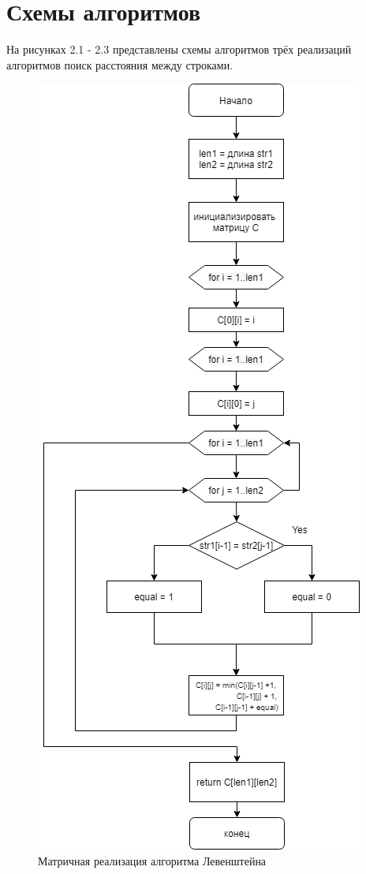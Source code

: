 \documentclass[12pt, a4paper]{report}
\begin{document}
	\section{Схемы алгоритмов}
	На рисунках 2.1 - 2.3 представлены схемы алгоритмов трёх реализаций алгоритмов поиск расстояния между строками.
	\begin{figure}[ht!]
		\centering
		\includegraphics[scale=0.5]{Dia1.png}
		\caption{Матричная реализация алгоритма Левенштейна}
		\label{fig:leven}
	\end{figure}
\end{document}
